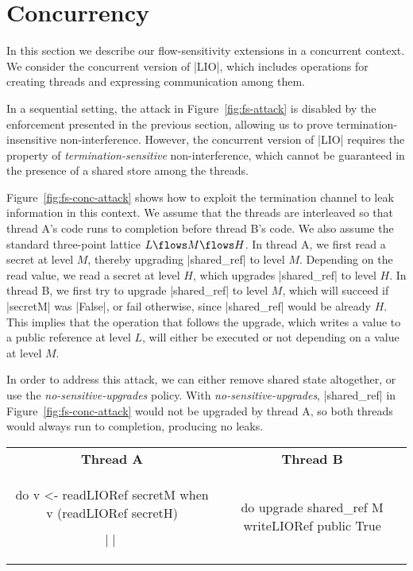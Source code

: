 \section{Concurrency}

In this section we describe our flow-sensitivity extensions in a
concurrent context. We consider the concurrent version of |LIO|, which
includes operations for creating threads and expressing communication
among them.

In a sequential setting, the attack in Figure~\ref{fig:fs-attack} is
disabled by the enforcement presented in the previous section,
allowing us to prove termination-insensitive
non-interference. However, the concurrent version of |LIO| requires
the property of \emph{termination-sensitive} non-interference, which
cannot be guaranteed in the presence of a shared store among the
threads.

Figure~\ref{fig:fs-conc-attack} shows how to exploit the termination
channel to leak information in this context. We assume that the
threads are interleaved so that thread A's code runs to completion
before thread B's code. We also assume the standard three-point
lattice $L\flows M\flows H$. In thread A, we first read a secret at
level $M$, thereby upgrading |shared_ref| to level $M$. Depending on
the read value, we read a secret at level $H$, which upgrades
|shared_ref| to level $H$. In thread B, we first try to upgrade
|shared_ref| to level $M$, which will succeed if |secretM| was
|False|, or fail otherwise, since |shared_ref| would be already
$H$. This implies that the operation that follows the upgrade, which
writes a value to a public reference at level $L$, will either be
executed or not depending on a value at level $M$. 

In order to address this attack, we can either remove shared state
altogether, or use the \emph{no-sensitive-upgrades} policy. With
\emph{no-sensitive-upgrades}, |shared_ref| in
Figure~\ref{fig:fs-conc-attack} would not be upgraded by thread A, so
both threads would always run to completion, producing no leaks.

\begin{figure*}[!ht]
\vspace*{-5pt}
\begin{tabular}{cc}
\textbf{Thread A} & \textbf{Thread B} \\
\begin{minipage}{0.45\linewidth}
\begin{code}
do  v <- readLIORef secretM
    when v (readLIORef secretH)
\end{code}  
\end{minipage} $\mid\!\mid$ &
\begin{minipage}{0.5\linewidth}
\begin{code}
do  upgrade shared_ref M
    writeLIORef public True
\end{code}
\end{minipage}
\end{tabular}
\caption{Flow-sensitive attack in a concurrent setting exploiting the termination channel.\label{fig:fs-conc-attack}}
\vspace*{-5pt}
\end{figure*}